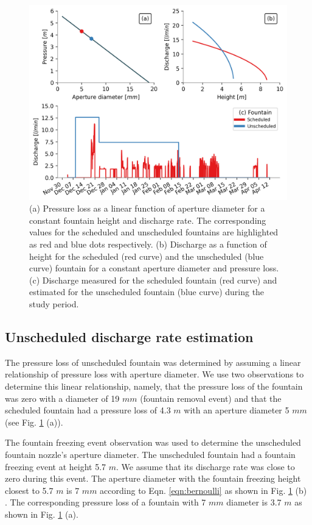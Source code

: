 \documentclass[tc, manuscript]{copernicus}
\begin{document}
\begin{figure}[t]
\includegraphics[width=12cm]{Figures/fountains.png}

\caption{ (a) Pressure loss as a linear function of aperture diameter for a constant fountain height and
  discharge rate. The corresponding values for the scheduled and unscheduled fountains are highlighted as red
  and blue dots respectively. (b) Discharge as a function of height for the scheduled (red curve) and the
  unscheduled (blue curve) fountain for a constant aperture diameter and pressure loss. (c) Discharge measured
  for the scheduled fountain (red curve) and estimated for the unscheduled fountain (blue curve) during the
study period.}

\label{fig:fountains}
\end{figure}

\subsection{Unscheduled discharge rate estimation}

The pressure loss of unscheduled fountain was determined by assuming a linear relationship of pressure loss with
aperture diameter. We use two observations to determine this linear relationship, namely, that the pressure loss
of the fountain was zero with a diameter of 19 $mm$ (fountain removal event) and that the scheduled fountain had
a pressure loss of 4.3 $m$ with an aperture diameter 5 $mm$ (see Fig. \ref{fig:fountains} (a)).

The fountain freezing event observation was used to determine the unscheduled fountain nozzle's aperture
diameter. The unscheduled fountain had a fountain freezing event at height 5.7 $m$. We assume that its discharge
rate was close to zero during this event.  The aperture diameter with the fountain freezing height closest to
5.7 $m$ is 7 $mm$ according to Eqn. \ref{eqn:bernoulli} as shown in Fig. \ref{fig:fountains} (b) . The
corresponding pressure loss of a fountain with 7 $mm$ diameter is 3.7 $m$ as shown in Fig. \ref{fig:fountains}
(a).
\end{document}
